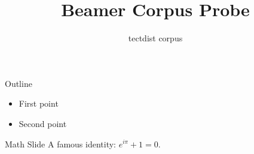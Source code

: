 \documentclass{beamer}
\title{Beamer Corpus Probe}
\author{tectdist corpus}
\begin{document}
\frame{\titlepage}
\begin{frame}{Outline}
\begin{itemize}
\item First point
\item Second point
\end{itemize}
\end{frame}
\begin{frame}{Math Slide}
A famous identity: $e^{i\pi}+1=0$.
\end{frame}
\end{document}

